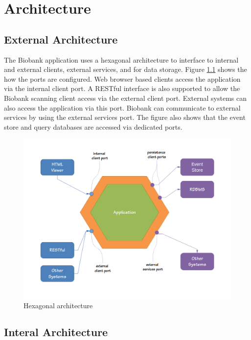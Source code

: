 \chapter{Architecture}

\section{External Architecture}

The Biobank application uses a hexagonal architecture to interface to internal
and external clients, external services, and for data storage. Figure
\ref{fig:hex-architecture} shows the how the ports are configured. Web browser
based clients access the application via the internal client port. A RESTful
interface is also supported to allow the Biobank scanning client access via the
external client port. External systems can also access the application via this
port. Biobank can communicate to external services by using the external
services port. The figure also shows that the event store and query databases
are accessed via dedicated ports.

\begin{figure}[H]
  \includegraphics[trim={15mm 18mm 15mm 12mm}, clip, width=1\textwidth]
		  {images/hex-architecture}
  \caption{Hexagonal architecture}
  \label{fig:hex-architecture}
\end{figure}

\section{Interal Architecture}

